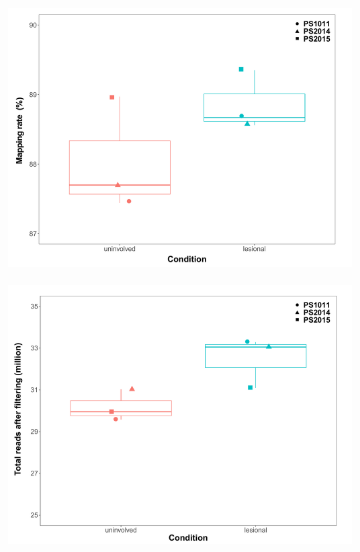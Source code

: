 \begin{figure}[htbp]
\centering
\begin{subfigure}{0.5\textwidth}
\centering
\includegraphics[width=\textwidth]{./Results2/pdfs/PS_lesional_uninvolved_RNAseq_uniquely_mapped_reads_percent_cell_type_and_batch_boxplots}
\caption{\textbf{}}
\end{subfigure}%
\begin{subfigure}{0.5\textwidth}
\centering
\includegraphics[width=\textwidth]{./Results2/pdfs/PS_lesional_uninvolved_RNAseq_total_reads_per_cell_type_and_batch}
\caption{\textbf{}}
\end{subfigure} \\

\end{figure}
